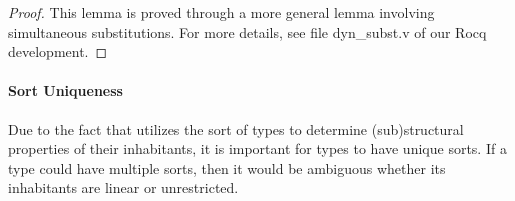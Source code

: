 
\begin{proof}
  This lemma is proved through a more general lemma involving simultaneous substitutions. 
  For more details, see file \textsf{dyn\_subst.v} of our Rocq development.
\end{proof}


\paragraph{\textbf{Sort Uniqueness}}
Due to the fact that \TLLC{} utilizes the sort of types to determine
(sub)structural properties of their inhabitants, it is important for types
to have unique sorts. If a type could have multiple sorts, then it would be
ambiguous whether its inhabitants are linear or unrestricted.

